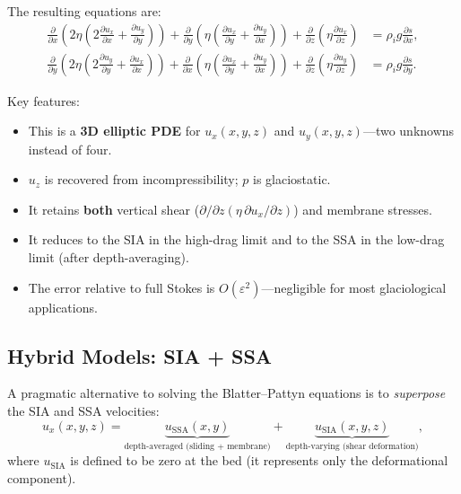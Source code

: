 \documentclass[11pt]{article}
\begin{document}
\medskip
\noindent The resulting equations are:
\begin{align}
  \frac{\partial}{\partial x}\!\left(2\eta\left(2\frac{\partial u_x}{\partial x} + \frac{\partial u_y}{\partial y}\right)\right) + \frac{\partial}{\partial y}\!\left(\eta\left(\frac{\partial u_x}{\partial y} + \frac{\partial u_y}{\partial x}\right)\right) + \frac{\partial}{\partial z}\!\left(\eta\frac{\partial u_x}{\partial z}\right) &= \rho_i g\frac{\partial s}{\partial x}, \label{eq:bp_x} \\[6pt]
  \frac{\partial}{\partial y}\!\left(2\eta\left(2\frac{\partial u_y}{\partial y} + \frac{\partial u_x}{\partial x}\right)\right) + \frac{\partial}{\partial x}\!\left(\eta\left(\frac{\partial u_x}{\partial y} + \frac{\partial u_y}{\partial x}\right)\right) + \frac{\partial}{\partial z}\!\left(\eta\frac{\partial u_y}{\partial z}\right) &= \rho_i g\frac{\partial s}{\partial y}. \label{eq:bp_y}
\end{align}

\noindent Key features:
\begin{itemize}[nosep]
  \item This is a \textbf{3D elliptic PDE} for $u_x(x,y,z)$ and $u_y(x,y,z)$---two unknowns instead of four.
  \item $u_z$ is recovered from incompressibility; $p$ is glaciostatic.
  \item It retains \textbf{both} vertical shear ($\partial/\partial z(\eta\,\partial u_x/\partial z)$) and membrane stresses.
  \item It reduces to the SIA in the high-drag limit and to the SSA in the low-drag limit (after depth-averaging).
  \item The error relative to full Stokes is $O(\varepsilon^2)$---negligible for most glaciological applications.
\end{itemize}

\subsection{Hybrid Models: SIA + SSA}

A pragmatic alternative to solving the Blatter--Pattyn equations is to \emph{superpose} the SIA and SSA velocities:
\begin{equation}
  u_x(x,y,z) = \underbrace{u_{\text{SSA}}(x,y)}_{\text{depth-averaged (sliding + membrane)}} + \underbrace{u_{\text{SIA}}(x,y,z)}_{\text{depth-varying (shear deformation)}},
  \label{eq:hybrid}
\end{equation}
where $u_{\text{SIA}}$ is defined to be zero at the bed (it represents only the deformational component).
\end{document}
